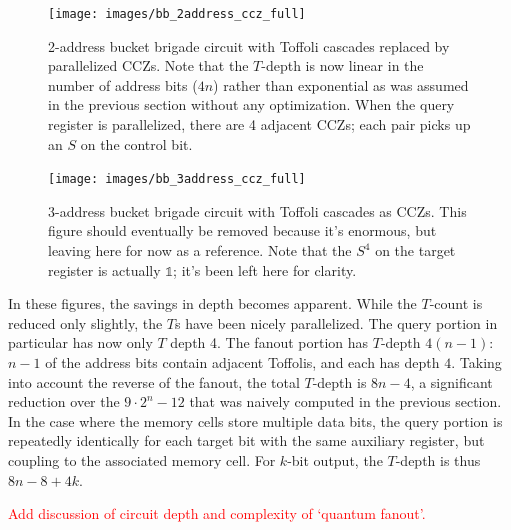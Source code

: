\documentclass[a4paper,12pt]{article}
\newcommand\todo[1]{\textcolor{red}{#1}}
\begin{document}
\begin{figure}
 \captionsetup{width=.89\linewidth}
 \texttt{[image: images/bb\_2address\_ccz\_full]}
 \caption{2-address bucket brigade circuit with Toffoli cascades replaced by parallelized CCZs. 
 Note that the $T$-depth is now linear in the number of address bits ($4n$) rather than exponential as was assumed in the previous section without any optimization.
 When the query register is parallelized, there are 4 adjacent CCZs; each pair picks up an $S$ on the control bit.}
 \label{fig:bb_2address_ccz_full}
\end{figure}

\begin{figure}
 \captionsetup{width=.89\linewidth}
 \texttt{[image: images/bb\_3address\_ccz\_full]}
 \caption{3-address bucket brigade circuit with Toffoli cascades as CCZs. 
 This figure should eventually be removed because it's enormous, but leaving here for now as a reference.
 Note that the $S^4$ on the target register is actually $\mathds{1}$; it's been left here for clarity.}
 \label{fig:bb_3address_ccz_full}
\end{figure}

In these figures, the savings in depth becomes apparent.
While the $T$-count is reduced only slightly, the $T$s have been nicely parallelized.
The query portion in particular has now only $T$ depth 4.
The fanout portion has $T$-depth $4(n-1)$: $n - 1$ of the address bits contain adjacent Toffolis, and each has depth $4$.
Taking into account the reverse of the fanout, the total $T$-depth is $8n - 4$, a significant reduction over the $9 \cdot 2^n - 12$ that was naively computed in the previous section.
In the case where the memory cells store multiple data bits, the query portion is repeatedly identically for each target bit with the same auxiliary register, but coupling to the associated memory cell. 
For $k$-bit output, the $T$-depth is thus $8n - 8 + 4k$.

\todo{Add discussion of circuit depth and complexity of `quantum fanout'.}
\end{document}
